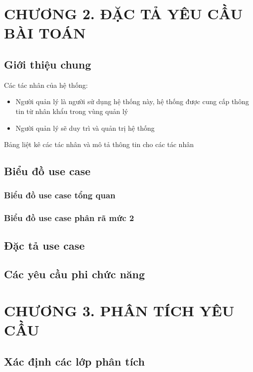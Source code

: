\documentclass{article}
\begin{document}
\section*{CHƯƠNG 2. ĐẶC TẢ YÊU CẦU BÀI TOÁN}
\setcounter{section}{2}
\setcounter{subsection}{0}
\subsection{Giới thiệu chung}
Các tác nhân của hệ thống: 
\begin{itemize}
    \item[-] Người quản lý là người sử dụng hệ thống này, hệ thống được cung cấp thông tin từ nhân khẩu trong vùng quản lý
    \item[-] Người quản lý sẽ duy trì và quản trị hệ thống 
\end{itemize}

Bảng liệt kê các tác nhân và mô tả thông tin cho các tác nhân

\subsection{Biểu đồ use case} 
\subsubsection{Biểu đồ use case tổng quan}
\subsubsection{Biểu đồ use case phân rã mức 2}
\subsection{Đặc tả use case}
\subsection{Các yêu cầu phi chức năng}
\newpage
\section*{CHƯƠNG 3. PHÂN TÍCH YÊU CẦU}
\setcounter{section}{3}
\setcounter{subsection}{0}
\subsection{Xác định các lớp phân tích}
\end{document}
